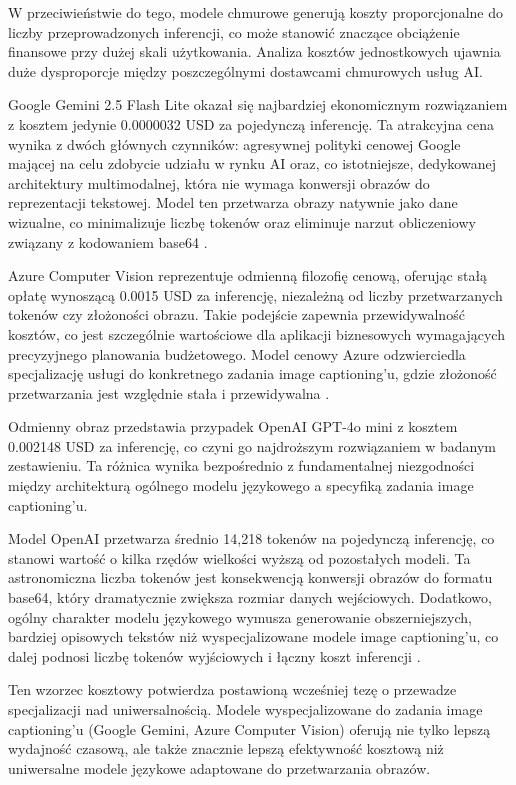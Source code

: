 W przeciwieństwie do tego, modele chmurowe generują koszty proporcjonalne do liczby przeprowadzonych inferencji, co może stanowić znaczące obciążenie finansowe
przy dużej skali użytkowania. Analiza kosztów jednostkowych ujawnia duże dysproporcje między poszczególnymi dostawcami chmurowych usług AI.

Google Gemini 2.5 Flash Lite okazał się najbardziej ekonomicznym rozwiązaniem z kosztem jedynie 0.0000032 USD za pojedynczą inferencję.
Ta atrakcyjna cena wynika z dwóch głównych czynników: agresywnej polityki cenowej Google mającej na celu zdobycie udziału w rynku AI
oraz, co istotniejsze, dedykowanej architektury multimodalnej, która nie wymaga konwersji obrazów do reprezentacji tekstowej.
Model ten przetwarza obrazy natywnie jako dane wizualne, co minimalizuje liczbę tokenów oraz eliminuje narzut obliczeniowy związany z kodowaniem base64 \cite{gemini_pricing2024}.

Azure Computer Vision reprezentuje odmienną filozofię cenową, oferując stałą opłatę wynoszącą 0.0015 USD za inferencję,
niezależną od liczby przetwarzanych tokenów czy złożoności obrazu. Takie podejście zapewnia przewidywalność kosztów, co jest szczególnie wartościowe
dla aplikacji biznesowych wymagających precyzyjnego planowania budżetowego. Model cenowy Azure odzwierciedla specjalizację usługi do konkretnego zadania
image captioning'u, gdzie złożoność przetwarzania jest względnie stała i przewidywalna \cite{azure_pricing2024}.

Odmienny obraz przedstawia przypadek OpenAI GPT-4o mini z kosztem 0.002148 USD za inferencję, co czyni go najdroższym rozwiązaniem
w badanym zestawieniu. Ta różnica wynika bezpośrednio z fundamentalnej niezgodności
między architekturą ogólnego modelu językowego a specyfiką zadania image captioning'u.

Model OpenAI przetwarza średnio 14,218 tokenów na pojedynczą inferencję, co stanowi wartość o kilka rzędów wielkości wyższą od pozostałych modeli.
Ta astronomiczna liczba tokenów jest konsekwencją konwersji obrazów do formatu base64, który dramatycznie zwiększa rozmiar danych wejściowych.
Dodatkowo, ogólny charakter modelu językowego wymusza generowanie obszerniejszych, bardziej opisowych tekstów niż wyspecjalizowane modele
image captioning'u, co dalej podnosi liczbę tokenów wyjściowych i łączny koszt inferencji \cite{openai_completions2025}.

Ten wzorzec kosztowy potwierdza postawioną wcześniej tezę o przewadze specjalizacji nad uniwersalnością. Modele wyspecjalizowane do zadania image captioning'u
(Google Gemini, Azure Computer Vision) oferują nie tylko lepszą wydajność czasową, ale także znacznie lepszą efektywność kosztową
niż uniwersalne modele językowe adaptowane do przetwarzania obrazów.

